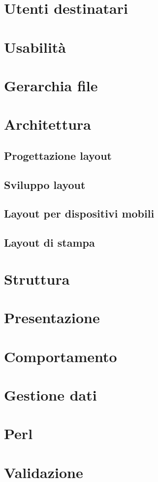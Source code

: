 \documentclass[11pt]{article}
\begin{document}
\section{Utenti destinatari}
\newpage
\section{Usabilità}
\newpage
\section{Gerarchia file}
\newpage
\section{Architettura}
\subsection{Progettazione layout}
\subsection{Sviluppo layout}
\subsection{Layout per dispositivi mobili}
\subsection{Layout di stampa}

\newpage
\section{Struttura}
\newpage

\section{Presentazione}
\newpage
\section{Comportamento}
\newpage
\section{Gestione dati}
\newpage
\section{Perl}
\newpage
\section{Validazione}
\end{document}
